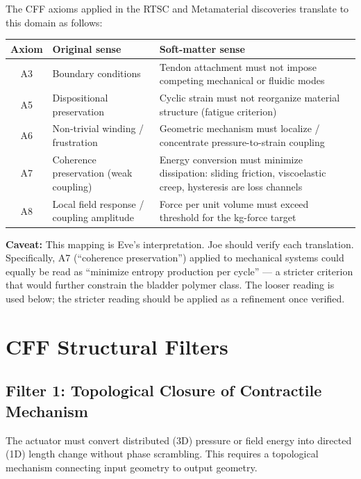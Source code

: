 \documentclass[11pt, a4paper]{article}
\begin{document}
The CFF axioms applied in the RTSC and Metamaterial discoveries
translate to this domain as follows:

\begin{center}
\begin{tabular}{@{}cp{4.5cm}p{8cm}@{}}
\toprule
\textbf{Axiom} & \textbf{Original sense} & \textbf{Soft-matter sense} \\
\midrule
A3 & Boundary conditions & Tendon attachment must not impose
    competing mechanical or fluidic modes \\
A5 & Dispositional preservation & Cyclic strain must not
    reorganize material structure (fatigue criterion) \\
A6 & Non-trivial winding / frustration & Geometric mechanism
    must localize / concentrate pressure-to-strain coupling \\
A7 & Coherence preservation (weak coupling) & Energy conversion
    must minimize dissipation: sliding friction, viscoelastic
    creep, hysteresis are loss channels \\
A8 & Local field response / coupling amplitude & Force per unit
    volume must exceed threshold for the kg-force target \\
\bottomrule
\end{tabular}
\end{center}

\textbf{Caveat:} This mapping is Eve's interpretation. Joe should
verify each translation. Specifically, A7 (``coherence
preservation'') applied to mechanical systems could equally be
read as ``minimize entropy production per cycle'' --- a stricter
criterion that would further constrain the bladder polymer class.
The looser reading is used below; the stricter reading should be
applied as a refinement once verified.

\section{CFF Structural Filters}

\subsection{Filter 1: Topological Closure of Contractile Mechanism}

The actuator must convert distributed (3D) pressure or field
energy into directed (1D) length change without phase scrambling.
This requires a topological mechanism connecting input geometry
to output geometry.
\end{document}
